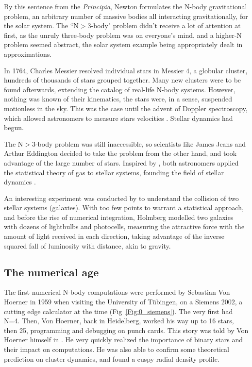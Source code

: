 By this sentence from the \textit{Principia}, Newton formulates the N-body gravitational problem, an arbitrary number of massive bodies all interacting gravitationally, for the solar system. The ``N$>$3-body" problem didn't receive a lot of attention at first, as the unruly three-body problem was on everyone's mind, and a higher-N problem seemed abstract, the solar system example being appropriately dealt in approximations.

In 1764, Charles Messier resolved individual stars in Messier 4, a globular cluster, hundreds of thousands of stars grouped together. Many new clusters were to be found afterwards, extending the catalog of real-life N-body systems. However, nothing was known of their kinematics, the stars were, in a sense, suspended motionless in the sky. This was the case until the advent of Doppler spectroscopy, which allowed astronomers to measure stars velocities \citep{Doppler1842}. Stellar dynamics had begun.

The N$>$3-body problem was still inaccessible, so scientists like James Jeans and Arthur Eddington decided to take the problem from the other hand, and took advantage of the large number of stars. Inspired by \cite{Poincare1906}, both astronomers applied the statistical theory of gas to stellar systems, founding the field of stellar dynamics \citep{Jeans1916,Eddington1916}.

An interesting experiment was conducted by \cite{Holmberg1941} to understand the collision of two stellar systems (galaxies). With too few points to warrant a statistical approach, and before the rise of numerical integration, Holmberg modelled two galaxies with dozens of lightbulbs and photocells, measuring the attractive force with the amount of light received in each direction, taking advantage of the inverse squared fall of luminosity with distance, akin to gravity.

\subsection*{The numerical age}

The first numerical N-body computations were performed by Sebastian Von Hoerner in 1959 when visiting the University of T\"ubingen, on a Siemens 2002, a cutting edge calculator at the time (Fig~\ref{Fig:0_siemens}). The very first had N=4. Then, Von Hoerner, back in Heidelberg, worked his way up to 16 stars, then 25, programming and debugging on punch cards. This story was told by Von Hoerner himself in \cite{VonHoerner2001}. He very quickly realized the importance of binary stars and their impact on computations. He was also able to confirm some theoretical prediction on cluster dynamics, and found a cuspy radial density profile\citep{VonHoerner1960,VonHoerner1963}.

